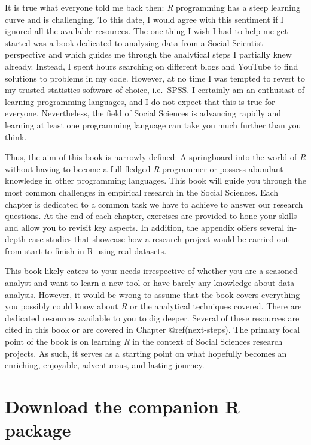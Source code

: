 \documentclass[
  letterpaper,
]{krantz}
\begin{document}
It is true what everyone told me back then: \emph{R} programming has a
steep learning curve and is challenging. To this date, I would agree
with this sentiment if I ignored all the available resources. The one
thing I wish I had to help me get started was a book dedicated to
analysing data from a Social Scientist perspective and which guides me
through the analytical steps I partially knew already. Instead, I spent
hours searching on different blogs and YouTube to find solutions to
problems in my code. However, at no time I was tempted to revert to my
trusted statistics software of choice, i.e.~SPSS. I certainly am an
enthusiast of learning programming languages, and I do not expect that
this is true for everyone. Nevertheless, the field of Social Sciences is
advancing rapidly and learning at least one programming language can
take you much further than you think.

Thus, the aim of this book is narrowly defined: A springboard into the
world of \emph{R} without having to become a full-fledged \emph{R}
programmer or possess abundant knowledge in other programming languages.
This book will guide you through the most common challenges in empirical
research in the Social Sciences. Each chapter is dedicated to a common
task we have to achieve to answer our research questions. At the end of
each chapter, exercises are provided to hone your skills and allow you
to revisit key aspects. In addition, the appendix offers several
in-depth case studies that showcase how a research project would be
carried out from start to finish in R using real datasets.

This book likely caters to your needs irrespective of whether you are a
seasoned analyst and want to learn a new tool or have barely any
knowledge about data analysis. However, it would be wrong to assume that
the book covers everything you possibly could know about \emph{R} or the
analytical techniques covered. There are dedicated resources available
to you to dig deeper. Several of these resources are cited in this book
or are covered in Chapter @ref(next-steps). The primary focal point of
the book is on learning \emph{R} in the context of Social Sciences
research projects. As such, it serves as a starting point on what
hopefully becomes an enriching, enjoyable, adventurous, and lasting
journey.

\section{Download the companion R
package}\label{sec-download-the-companion-r-package}
\end{document}

